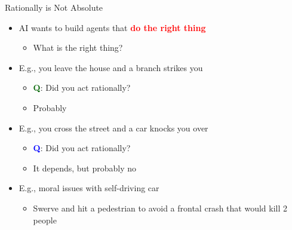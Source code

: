 \documentclass[
  10pt,
  ignorenonframetext,
]{beamer}
\providecommand{\tightlist}{%
  \setlength{\itemsep}{0pt}\setlength{\parskip}{0pt}}
\begin{document}
\begin{frame}{Rationally is Not Absolute}
\label{rationally-is-not-absolute}
\begin{itemize}
\tightlist
\item
  AI wants to build agents that
  \textbf{\textcolor{red}{do the right thing}}

  \begin{itemize}
  \tightlist
  \item
    What is the right thing?
  \end{itemize}
\item
  E.g., you leave the house and a branch strikes you

  \begin{itemize}
  \tightlist
  \item
    \textbf{\textcolor{darkgreen}{Q}}: Did you act rationally?
  \item
    Probably
  \end{itemize}
\item
  E.g., you cross the street and a car knocks you over

  \begin{itemize}
  \tightlist
  \item
    \textbf{\textcolor{blue}{Q}}: Did you act rationally?
  \item
    It depends, but probably no
  \end{itemize}
\item
  E.g., moral issues with self-driving car

  \begin{itemize}
  \tightlist
  \item
    Swerve and hit a pedestrian to avoid a frontal crash that would kill
    2 people
  \end{itemize}
\end{itemize}
\end{frame}
\end{document}
